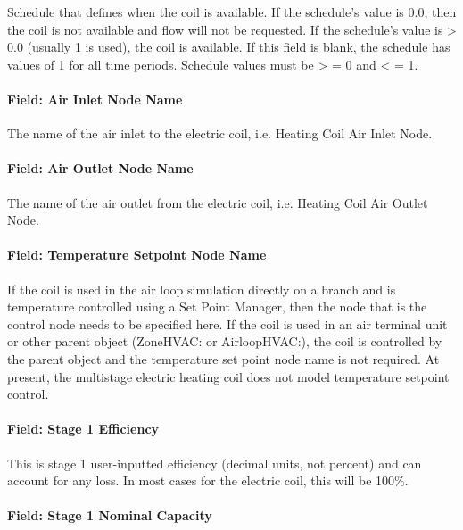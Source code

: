 Schedule that defines when the coil is available. If the schedule's value is 0.0, then the coil is not available and flow will not be requested. If the schedule's value is \textgreater{} 0.0 (usually 1 is used), the coil is available. If this field is blank, the schedule has values of 1 for all time periods. Schedule values must be \textgreater{} = 0 and \textless{} = 1.

\paragraph{Field: Air Inlet Node Name}\label{field-air-inlet-node-name-4-001}

The name of the air inlet to the electric coil, i.e. Heating Coil Air Inlet Node.

\paragraph{Field: Air Outlet Node Name}\label{field-air-outlet-node-name-4-001}

The name of the air outlet from the electric coil, i.e. Heating Coil Air Outlet Node.

\paragraph{Field: Temperature Setpoint Node Name}\label{field-temperature-setpoint-node-name-2}

If the coil is used in the air loop simulation directly on a branch and is temperature controlled using a Set Point Manager, then the node that is the control node needs to be specified here. If the coil is used in an air terminal unit or other parent object (ZoneHVAC: or AirloopHVAC:), the coil is controlled by the parent object and the temperature set point node name is not required. At present, the multistage electric heating coil does not model temperature setpoint control.

\paragraph{Field: Stage 1 Efficiency}\label{field-stage-1-efficiency}

This is stage 1 user-inputted efficiency (decimal units, not percent) and can account for any loss. In most cases for the electric coil, this will be 100\%.

\paragraph{Field: Stage 1 Nominal Capacity}\label{field-stage-1-nominal-capacity}

